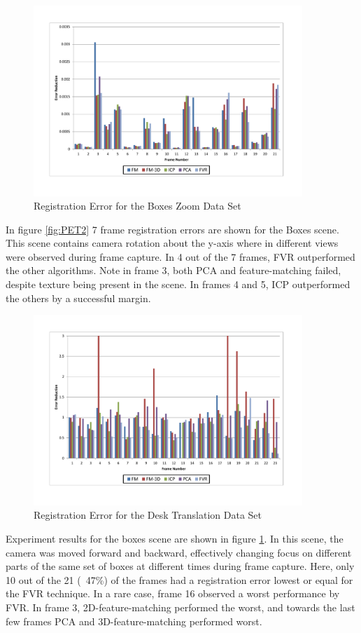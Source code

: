 \begin{figure}[!htb]
\centering
\includegraphics[width=4.0in]{images/results/Boxes_Texture_ZoomOut}
\caption{Registration Error for the Boxes Zoom Data Set}
\label{fig:PET3}
\end{figure}

In figure \ref{fig:PET2} 7 frame registration errors are shown for the Boxes scene. This scene contains camera rotation about the y-axis where in different views were observed during frame capture. In 4 out of the 7 frames, FVR outperformed the other algorithms. Note in frame 3, both PCA and feature-matching failed, despite texture being present in the scene. In frames 4 and 5, ICP outperformed the others by a successful margin.  \\

\begin{figure}[!htb]
\centering
\includegraphics[width=4.0in]{images/results/Desk_Texture_Translation}
\caption{Registration Error for the Desk Translation Data Set}
\label{fig:PET4}
\end{figure}

Experiment results for the boxes scene are shown in figure \ref{fig:PET3}. In this scene, the camera was moved forward and backward, effectively changing focus on different parts of the same set of boxes at different times during frame capture. Here, only 10 out of the 21 (~47\%) of the frames had a registration error lowest or equal for the FVR technique. In a rare case, frame 16 observed a worst performance by FVR. In frame 3, 2D-feature-matching performed the worst, and towards the last few frames PCA and 3D-feature-matching performed worst. \\

